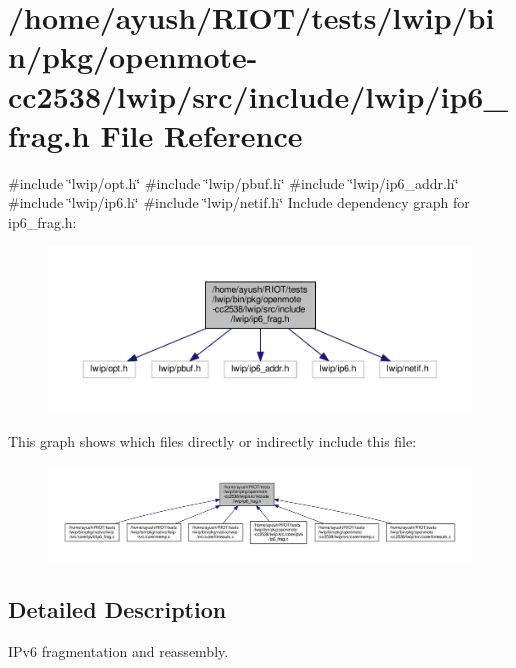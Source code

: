 \hypertarget{openmote-cc2538_2lwip_2src_2include_2lwip_2ip6__frag_8h}{}\section{/home/ayush/\+R\+I\+O\+T/tests/lwip/bin/pkg/openmote-\/cc2538/lwip/src/include/lwip/ip6\+\_\+frag.h File Reference}
\label{openmote-cc2538_2lwip_2src_2include_2lwip_2ip6__frag_8h}
{\ttfamily \#include \char`\"{}lwip/opt.\+h\char`\"{}}\newline
{\ttfamily \#include \char`\"{}lwip/pbuf.\+h\char`\"{}}\newline
{\ttfamily \#include \char`\"{}lwip/ip6\+\_\+addr.\+h\char`\"{}}\newline
{\ttfamily \#include \char`\"{}lwip/ip6.\+h\char`\"{}}\newline
{\ttfamily \#include \char`\"{}lwip/netif.\+h\char`\"{}}\newline
Include dependency graph for ip6\+\_\+frag.\+h\+:
\nopagebreak
\begin{figure}[H]
\begin{center}
\leavevmode
\includegraphics[width=350pt]{openmote-cc2538_2lwip_2src_2include_2lwip_2ip6__frag_8h__incl}
\end{center}
\end{figure}
This graph shows which files directly or indirectly include this file\+:
\nopagebreak
\begin{figure}[H]
\begin{center}
\leavevmode
\includegraphics[width=350pt]{openmote-cc2538_2lwip_2src_2include_2lwip_2ip6__frag_8h__dep__incl}
\end{center}
\end{figure}


\subsection{Detailed Description}
I\+Pv6 fragmentation and reassembly. 